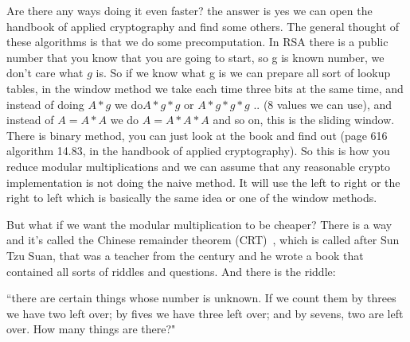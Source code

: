 Are there any ways doing it even faster? the answer is yes we can open the
handbook of applied cryptography and find some others. The general thought of
these algorithms is that we do some precomputation. In RSA there is a public
number that you know that you are going to start, so g is known number, we don't
care what $g$ is. So if we know what g is we can prepare all sort of lookup
tables, in the window method we take each time three bits at the same time, and
instead of doing \(A*g\) we do\( A*g*g\) or \(A*g*g*g\) .. (8 values we can
use), and instead of \( A=A*A\) we do \(A=A*A*A\) and so on, this is the sliding
window. There is binary method, you can just look at the book and find out (page
616 algorithm 14.83, in the handbook of applied cryptography). So this is how
you reduce modular multiplications and we can assume that any reasonable crypto
implementation is not doing the naive method. It will use the left to right or
the right to left which is basically the same idea or one of the window methods.

But what if we want the modular multiplication to be cheaper? There is a way and
it's called the Chinese remainder theorem (CRT)~\cite{dingyi1996chinese}, which
is called after Sun Tzu Suan, that was a teacher from the  century and he
wrote a book that contained all sorts of riddles and questions. And there is the
riddle: 

``there are certain things whose number is unknown.  If we count them by threes
we have two left over; by fives we have three left over; and by sevens, two are
left over. How many things are there?" 


